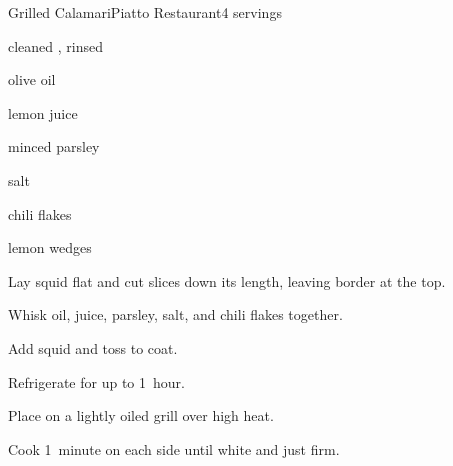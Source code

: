 \begin{recipe}{Grilled Calamari}{Piatto Restaurant}{4 servings}

\begin{ingredients}
\item {} cleaned , rinsed
\item \C{\quarter} olive oil
\item {} lemon juice
\item {} minced parsley
\item \tp{\half} salt
\item \tp{\half} chili flakes
\item lemon wedges
\end{ingredients}

\begin{directions}
\item Lay squid flat and cut \inch{\quarter} slices down its length, leaving \inch{\quarter} border at the top.
\item Whisk oil, juice, parsley, salt, and chili flakes together.
\item Add squid and toss to coat.
\item Refrigerate for up to 1~hour.
\item Place on a lightly oiled grill over high heat.
\item Cook 1~minute on each side until white and just firm.
\end{directions}

\end{recipe}
